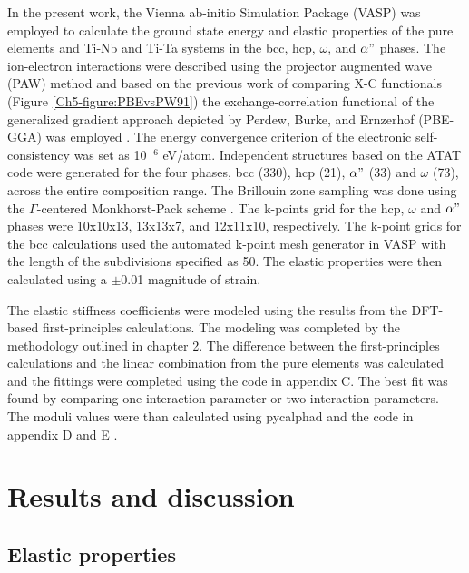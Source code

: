 In the present work, the Vienna ab-initio Simulation Package (VASP) \cite{Kresse1996} was employed to calculate the ground state energy and elastic properties of the pure elements and Ti-Nb and Ti-Ta systems in the bcc, hcp, $\omega$, and $\alpha"$ phases. The ion-electron interactions were described using the projector augmented wave (PAW) \cite{Kresse1999,Blochl1994} method and based on the previous work of comparing X-C functionals (Figure \ref{Ch5-figure:PBEvsPW91}) the exchange-correlation functional of the generalized gradient approach depicted by Perdew, Burke, and Ernzerhof (PBE-GGA) was employed \cite{Perdew1996a}. The energy convergence criterion of the electronic self-consistency was set as 10$^{-6}$ eV/atom. Independent structures based on the ATAT code were generated for the four phases, bcc (330), hcp (21), $\alpha"$ (33) and $\omega$ (73), across the entire composition range. The Brillouin zone sampling was done using the $\Gamma$-centered Monkhorst-Pack scheme \cite{Monkhorst1976a}. The k-points grid for the hcp, $\omega$ and $\alpha"$ phases were 10x10x13, 13x13x7, and 12x11x10, respectively. The k-point grids for the bcc calculations used the automated k-point mesh generator in VASP with the length of the subdivisions specified as 50. The elastic properties were then calculated using a $\pm$0.01 magnitude of strain.

The elastic stiffness coefficients were modeled using the results from the DFT-based first-principles calculations. The modeling was completed by the methodology outlined in chapter 2. The difference between the first-principles calculations and the linear combination from the pure elements was calculated and the fittings were completed using the code in appendix C. The best fit was found by comparing one interaction parameter or two interaction parameters. The moduli values were than calculated using pycalphad and the code in appendix D and E \cite{Otis2017}.

\section{Results and discussion}

\subsection{Elastic properties}

